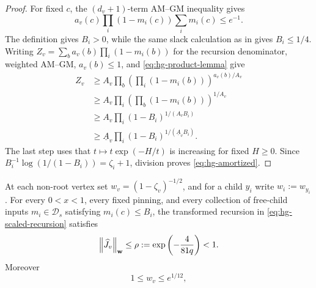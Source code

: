 \begin{proof}
For fixed $c$, the $(d_v+1)$-term AM--GM inequality gives
\[
 a_v(c)\prod_i(1-m_i(c))\sum_i m_i(c)\le e^{-1}.
\]
The definition gives $B_i>0$, while the same slack calculation as in
 gives $B_i\le1/4$.
Writing
\(Z_v=\sum_b a_v(b)\prod_i(1-m_i(b))\)
for the recursion denominator, weighted AM--GM, \(a_v(b)\le1\), and
\eqref{eq:hg-product-lemma} give
\begin{align*}
 Z_v
 &\ge A_v\prod_b
    \left(\prod_i(1-m_i(b))\right)^{a_v(b)/A_v}\\
 &\ge A_v\prod_i
    \left(\prod_b(1-m_i(b))\right)^{1/A_v}\\
 &\ge A_v\prod_i(1-B_i)^{1/(A_vB_i)}\\
 &\ge \underline A_v
       \prod_i(1-B_i)^{1/(\underline A_vB_i)}.
\end{align*}
The last step uses that $t\mapsto t\exp(-H/t)$ is increasing for fixed
$H\ge0$.  Since
$B_i^{-1}\log(1/(1-B_i))=\zeta_i+1$, division proves
\eqref{eq:hg-amortized}.
\end{proof}

\begin{lemma}
\label{lem:hg-strong-jacobian}
At each non-root vertex set
$w_v=(1-\zeta_v)^{-1/2}$, and for a child \(y_i\) write
\(w_i:=w_{y_i}\).  For every $0<x<1$, every fixed pinning, and
every collection of free-child inputs $m_i\in\mathcal D_s$ satisfying
$m_i(c)\le B_i$, the transformed recursion in
\eqref{eq:hg-scaled-recursion} satisfies
\begin{equation}
  \left\|\widehat J_v\right\|_{\mathbf w}\le
  \rho:=\exp\left(-\frac4{81q}\right)<1.
  \label{eq:hg-rho}
\end{equation}
Moreover
\begin{equation}
  1\le w_v\le e^{1/12},
  \label{eq:hg-weight-range}
\end{equation}
\end{lemma}

